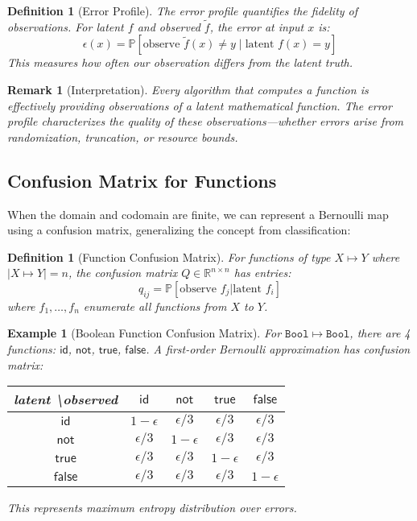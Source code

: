 \documentclass[11pt,final,hidelinks]{article}
\newtheorem{definition}[theorem]{Definition}
\newtheorem{example}[theorem]{Example}
\newtheorem{remark}[theorem]{Remark}
\newcommand{\obs}[1]{\widetilde{#1}}  %
\newcommand{\Type}[1]{\mathtt{#1}}
\newcommand{\Prob}[1]{\mathbb{P}\left[#1\right]}
\newcommand{\error}{\epsilon}
\newcommand{\Bool}{\Type{Bool}}
\begin{document}
\begin{definition}[Error Profile]
The error profile quantifies the fidelity of observations. For latent $f$ and observed $\obs{f}$, the error at input $x$ is:
\begin{equation}
\error(x) = \Prob{\text{observe } \obs{f}(x) \neq y \mid \text{latent } f(x) = y}
\end{equation}
This measures how often our observation differs from the latent truth.
\end{definition}

\begin{remark}[Interpretation]
Every algorithm that computes a function is effectively providing observations of a latent mathematical function. The error profile characterizes the quality of these observations—whether errors arise from randomization, truncation, or resource bounds.
\end{remark}

\subsection{Confusion Matrix for Functions}

When the domain and codomain are finite, we can represent a Bernoulli map using a confusion matrix, generalizing the concept from classification:

\begin{definition}[Function Confusion Matrix]
For functions of type $X \mapsto Y$ where $|X \mapsto Y| = n$, the confusion matrix $Q \in \mathbb{R}^{n \times n}$ has entries:
\begin{equation}
q_{ij} = \Prob{\text{observe } f_j | \text{latent } f_i}
\end{equation}
where $f_1, \ldots, f_n$ enumerate all functions from $X$ to $Y$.
\end{definition}

\begin{example}[Boolean Function Confusion Matrix]
For $\Bool \mapsto \Bool$, there are 4 functions: $\mathsf{id}$, $\mathsf{not}$, $\mathsf{true}$, $\mathsf{false}$. A first-order Bernoulli approximation has confusion matrix:

\begin{center}
\begin{tabular}{c|cccc}
latent \textbackslash observed & $\mathsf{id}$ & $\mathsf{not}$ & $\mathsf{true}$ & $\mathsf{false}$ \\
\hline
$\mathsf{id}$ & $1-\epsilon$ & $\epsilon/3$ & $\epsilon/3$ & $\epsilon/3$ \\
$\mathsf{not}$ & $\epsilon/3$ & $1-\epsilon$ & $\epsilon/3$ & $\epsilon/3$ \\
$\mathsf{true}$ & $\epsilon/3$ & $\epsilon/3$ & $1-\epsilon$ & $\epsilon/3$ \\
$\mathsf{false}$ & $\epsilon/3$ & $\epsilon/3$ & $\epsilon/3$ & $1-\epsilon$
\end{tabular}
\end{center}

This represents maximum entropy distribution over errors.
\end{example}
\end{document}
